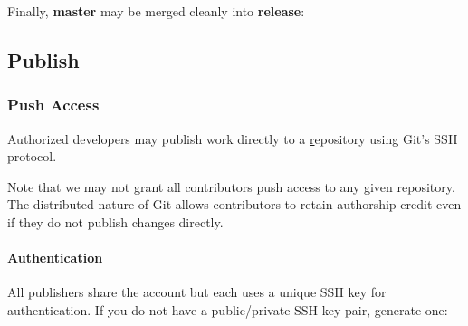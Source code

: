 Finally, \textbf{master} may be merged cleanly into \textbf{release}:

\begin{figure}
\centering
{}
\label{fig:MergeConflictResolutionBranchIntoRelease}
\end{figure}


\subsection{Publish}
\label{subsec:Publish}


\subsubsection{Push Access}
\label{subsubsec:PushAccess}

Authorized developers may publish work directly to a \href{public.kitware.com}
repository using Git's SSH protocol.

Note that we may not grant all contributors push access to any given repository.
The distributed nature of Git allows contributors to retain authorship credit
even if they do not publish changes directly.

\paragraph{Authentication}
\label{par:Authentication}

All publishers share the  account but each uses a
unique SSH key for authentication. If you do not have a public/private SSH key
pair, generate one:

